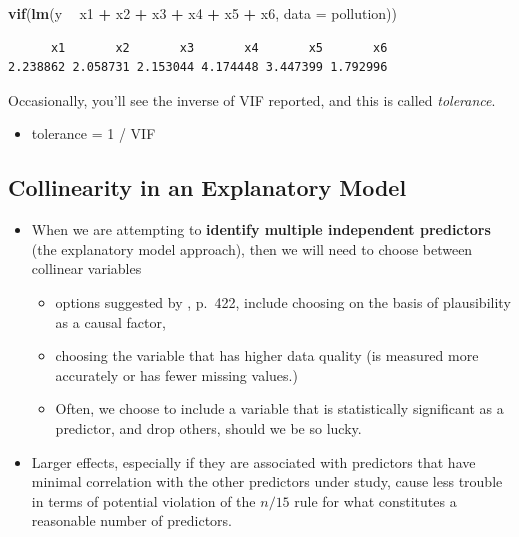 \documentclass[]{book}
\newenvironment{Shaded}{\begin{snugshade}}{\end{snugshade}}
\newcommand{\KeywordTok}[1]{\textcolor[rgb]{0.13,0.29,0.53}{\textbf{#1}}}
\newcommand{\DataTypeTok}[1]{\textcolor[rgb]{0.13,0.29,0.53}{#1}}
\newcommand{\StringTok}[1]{\textcolor[rgb]{0.31,0.60,0.02}{#1}}
\newcommand{\OperatorTok}[1]{\textcolor[rgb]{0.81,0.36,0.00}{\textbf{#1}}}
\newcommand{\NormalTok}[1]{#1}
\providecommand{\tightlist}{%
  \setlength{\itemsep}{0pt}\setlength{\parskip}{0pt}}
\theoremstyle{definition}
\theoremstyle{definition}
\theoremstyle{definition}
\theoremstyle{remark}
\begin{document}
\begin{Shaded}
\begin{Highlighting}[]
\KeywordTok{vif}\NormalTok{(}\KeywordTok{lm}\NormalTok{(y }\OperatorTok{~}\StringTok{ }\NormalTok{x1 }\OperatorTok{+}\StringTok{ }\NormalTok{x2 }\OperatorTok{+}\StringTok{ }\NormalTok{x3 }\OperatorTok{+}\StringTok{ }\NormalTok{x4 }\OperatorTok{+}\StringTok{ }\NormalTok{x5 }\OperatorTok{+}\StringTok{ }\NormalTok{x6, }\DataTypeTok{data =}\NormalTok{ pollution))}
\end{Highlighting}
\end{Shaded}

\begin{verbatim}
      x1       x2       x3       x4       x5       x6 
2.238862 2.058731 2.153044 4.174448 3.447399 1.792996 
\end{verbatim}

Occasionally, you'll see the inverse of VIF reported, and this is called
\emph{tolerance}.

\begin{itemize}
\tightlist
\item
  tolerance = 1 / VIF
\end{itemize}

\subsection{Collinearity in an Explanatory
Model}\label{collinearity-in-an-explanatory-model}

\begin{itemize}
\tightlist
\item
  When we are attempting to \textbf{identify multiple independent
  predictors} (the explanatory model approach), then we will need to
  choose between collinear variables

  \begin{itemize}
  \tightlist
  \item
    options suggested by \citet{Vittinghoff2012}, p.~422, include
    choosing on the basis of plausibility as a causal factor,
  \item
    choosing the variable that has higher data quality (is measured more
    accurately or has fewer missing values.)
  \item
    Often, we choose to include a variable that is statistically
    significant as a predictor, and drop others, should we be so lucky.
  \end{itemize}
\item
  Larger effects, especially if they are associated with predictors that
  have minimal correlation with the other predictors under study, cause
  less trouble in terms of potential violation of the \(n/15\) rule for
  what constitutes a reasonable number of predictors.
\end{itemize}
\end{document}
